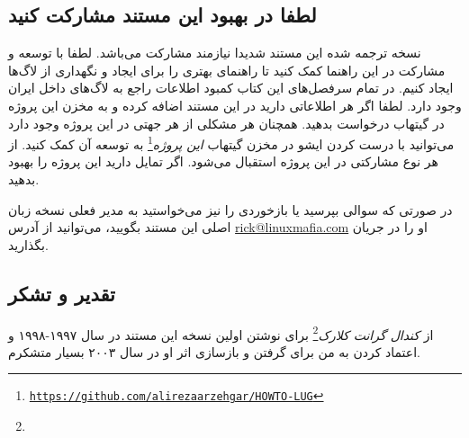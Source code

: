 \subsection{لطفا در  بهبود این مستند مشارکت کنید}

نسخه ترجمه شده این مستند شدیدا نیازمند مشارکت می‌باشد. لطفا با توسعه و مشارکت در این راهنما
کمک کنید تا راهنمای بهتری را برای ایجاد و نگهداری از لاگ‌ها ایجاد کنیم. در تمام سرفصل‌های این کتاب
کمبود اطلاعات راجع به لاگ‌های داخل ایران وجود دارد. لطفا اگر هر اطلاعاتی دارید در این مستند اضافه کرده
و به مخزن این پروژه در گیتهاب درخواست بدهید. همچنان هر مشکلی از هر جهتی در این پروژه وجود دارد
می‌توانید با درست کردن ایشو در مخزن گیتهاب
\emph{این پروژه}\footnote{\texttt{\url{https://github.com/alirezaarzehgar/HOWTO-LUG}}}
به توسعه آن کمک کنید.
از هر نوع مشارکتی در این پروژه استقبال می‌شود. اگر تمایل دارید این پروژه را بهبود بدهید.

در صورتی که سوالی بپرسید یا بازخوردی را نیز می‌خواستید به مدیر فعلی نسخه زبان اصلی این مستند بگویید،
می‌توانید از آدرس
\href{mailto:rick@linuxmafia.com}{rick@linuxmafia.com}
او را در جریان بگذارید.


%

\subsection{تقدیر و تشکر}

از
\emph{کندال گرانت کلارک}\footnote{}
برای نوشتن اولین نسخه این مستند در سال ۱۹۹۷-۱۹۹۸ و اعتماد کردن به من برای گرفتن و بازسازی
اثر او در سال ۲۰۰۳ بسیار متشکرم.

